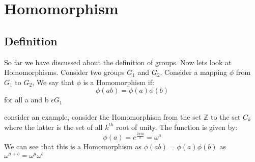 
\section{Homomorphism} \label{Homomorphisms}




\subsection{Definition}
So far we have discussed about the definition of groups. Now lets look at Homomorphisms. Consider two groups $G_{1}$ and $G_{2}$. Consider a mapping $\phi$ from $G_{1}$ to $G_{2}$, We say that $\phi$ is a Homomorphism if:
\begin{equation}
    \phi(ab)=\phi(a)\phi(b)
\end{equation}
for all a and b $ \epsilon  G_{1}$

consider an example, consider the Homomorphism from the set $\mathbb{Z}$ to the set $C_{k}$ where the latter is the set of all $k^{th}$ root of unity. The function is given by:
\begin{equation}
    \phi(a)=e^{\frac{2\pi ia}{k}}=\omega^{a}
\end{equation}
We can see that this is a Homomorphism as $\phi(ab)=\phi(a)\phi(b)$ as $\omega^{a+b}=\omega^{a}\omega^{b}$















